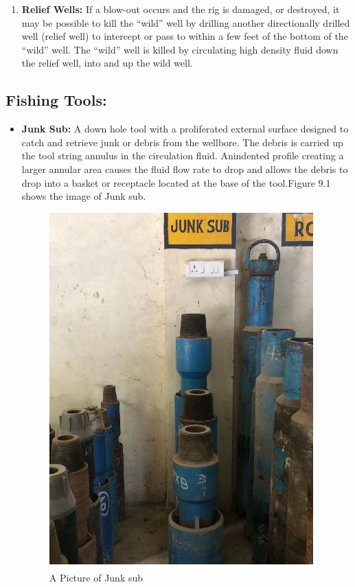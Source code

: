 \begin{enumerate}
\item \textbf{Relief Wells:} If a blow-out occurs and the rig is
damaged, or destroyed, it may be possible to kill
the “wild” well by drilling another directionally
drilled well (relief well) to intercept or pass to
within a few feet of the bottom of the “wild”
well. The “wild” well is killed by circulating
high density fluid down the relief well, into and
up the wild well.

\end{enumerate}



\subsection*{Fishing Tools:}

\begin{itemize}

\item \textbf{Junk Sub:} A down hole tool with a proliferated external surface
designed to catch and retrieve junk or debris from the wellbore. The
debris is carried up the tool string annulus in the circulation fluid. Anindented profile creating a larger annular area causes the fluid flow
rate to drop and allows the debris to drop into a basket or receptacle
located at the base of the tool.Figure 9.1 shows the image of Junk sub.

\begin{figure}[h]
\includegraphics[scale=0.3]{images/junksub}
\centering 
\caption{A Picture of Junk sub}
\end{figure}



\end{itemize}

